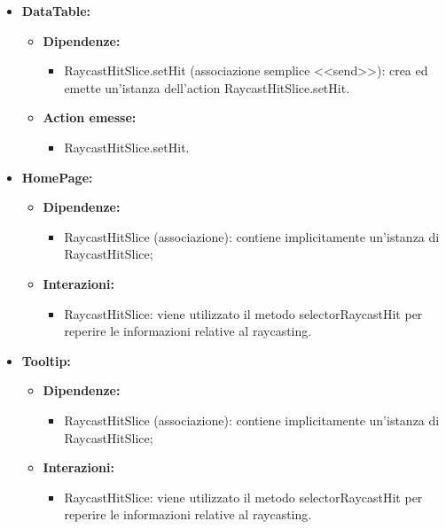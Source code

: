 \begin{itemize}
      \item \textbf{DataTable:}
            \begin{itemize}
                  \item \textbf{Dipendenze:}
                        \begin{itemize}
                              \item RaycastHitSlice.setHit (associazione semplice <<send>>): crea ed
                                    emette un'istanza dell'action RaycastHitSlice.setHit.
                        \end{itemize}
                  \item \textbf{Action emesse:}
                        \begin{itemize}
                              \item RaycastHitSlice.setHit.
                        \end{itemize}
            \end{itemize}

      \item \textbf{HomePage:}
      \begin{itemize}
            \item \textbf{Dipendenze:}
                  \begin{itemize}
                        \item RaycastHitSlice (associazione): contiene implicitamente un'istanza di
                              RaycastHitSlice;
                  \end{itemize}
            \item \textbf{Interazioni:}
                  \begin{itemize}
                        \item RaycastHitSlice: viene utilizzato il metodo selectorRaycastHit per reperire le
                              informazioni relative al raycasting.
                  \end{itemize}
      \end{itemize}

      \item \textbf{Tooltip:}
            \begin{itemize}
                  \item \textbf{Dipendenze:}
                        \begin{itemize}
                              \item RaycastHitSlice (associazione): contiene implicitamente un'istanza di
                                    RaycastHitSlice;
                        \end{itemize}
                  \item \textbf{Interazioni:}
                        \begin{itemize}
                              \item RaycastHitSlice: viene utilizzato il metodo selectorRaycastHit per reperire le
                                    informazioni relative al raycasting.
                        \end{itemize}
            \end{itemize}


\end{itemize}
